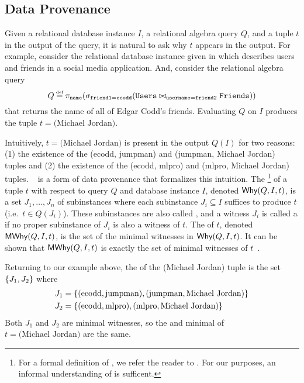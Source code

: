 \subsection{Data Provenance}
Given a relational database instance $I$, a relational algebra query $Q$, and a
tuple $t$ in the output of the query, it is natural to ask why $t$ appears in
the output. For example, consider the relational database instance given in
 which describes users and friends in a social media
application.  And, consider the relational algebra query
\[
  Q \defeq \pi_{\ttt{name}}(
             \sigma_{\ttt{friend1} = \ttt{ecodd}}(
                \ttt{Users} \join_{\ttt{username} = \ttt{friend2}} \ttt{Friends}
             )
           )
\]
that returns the name of all of Edgar Codd's friends. Evaluating $Q$ on $I$
produces the tuple $t = \text{(Michael Jordan)}$.

{}

Intuitively, $t = \text{(Michael Jordan)}$ is present in the output $Q(I)$ for
two reasons: (1) the existence of the (ecodd, jumpman) and (jumpman, Michael
Jordan) tuples and (2) the existence of the (ecodd, mlpro) and (mlpro, Michael
Jordan) tuples.  ~\cite{buneman2001and,
cheney2009provenance} is a form of data provenance that formalizes this
intuition. The
\whyprovenance{}\footnote{
  For a formal definition of \whyprovenance{}, we refer the reader to
  \cite{cheney2009provenance}. For our purposes, an informal understanding of
  \whyprovenance{} is sufficent.
}
of a tuple $t$ with respect to query $Q$ and database instance $I$, denoted
$\textsf{Why}(Q, I, t)$, is a set $J_1, \ldots, J_n$ of subinstances where each
subinstance $J_i \subseteq I$ suffices to produce $t$ (i.e.\ $t \in Q(J_i)$).
These subinstances are also called , and a witness
$J_i$ is called a  if no proper subinstance of
$J_i$ is also a witness of $t$. The  of $t$,
denoted $\textsf{MWhy}(Q, I, t)$, is the set of the minimal witnesses in $\textsf{Why}(Q, I,
t)$. It can be shown that $\textsf{MWhy}(Q, I, t)$ is exactly the set of minimal
witnesses of $t$~\cite{cheney2009provenance}.

Returning to our example above, the \whyprovenance{} of the (Michael Jordan)
tuple is the set $\{J_1, J_2\}$ where
\begin{align*}
  J_1 &= \{(\text{ecodd}, \text{jumpman}), (\text{jumpman}, \text{Michael Jordan})\} \\
  J_2 &= \{(\text{ecodd}, \text{mlpro}), (\text{mlpro}, \text{Michael Jordan})\}
\end{align*}
Both $J_1$ and $J_2$ are minimal witnesses, so the \whyprovenance{} and minimal
\whyprovenance{} of $t = \text{(Michael Jordan)}$ are the same.


